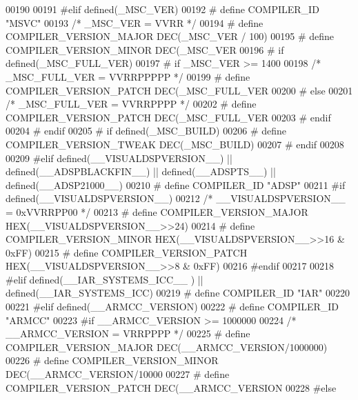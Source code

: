 \begin{DoxyCode}
{{{{{{{{{{{{{{{{{{{{{{{00190 
00191 \textcolor{preprocessor}{#elif defined(\_MSC\_VER)}
00192 \textcolor{preprocessor}{# define COMPILER\_ID "MSVC"}
00193   \textcolor{comment}{/* \_MSC\_VER = VVRR */}
00194 \textcolor{preprocessor}{# define COMPILER\_VERSION\_MAJOR DEC(\_MSC\_VER / 100)}
00195 \textcolor{preprocessor}{# define COMPILER\_VERSION\_MINOR DEC(\_MSC\_VER %
00196 \textcolor{preprocessor}{# if defined(\_MSC\_FULL\_VER)}
00197 \textcolor{preprocessor}{#  if \_MSC\_VER >= 1400}
00198     \textcolor{comment}{/* \_MSC\_FULL\_VER = VVRRPPPPP */}
00199 \textcolor{preprocessor}{#   define COMPILER\_VERSION\_PATCH DEC(\_MSC\_FULL\_VER %
00200 \textcolor{preprocessor}{#  else}
00201     \textcolor{comment}{/* \_MSC\_FULL\_VER = VVRRPPPP */}
00202 \textcolor{preprocessor}{#   define COMPILER\_VERSION\_PATCH DEC(\_MSC\_FULL\_VER %
00203 \textcolor{preprocessor}{#  endif}
00204 \textcolor{preprocessor}{# endif}
00205 \textcolor{preprocessor}{# if defined(\_MSC\_BUILD)}
00206 \textcolor{preprocessor}{#  define COMPILER\_VERSION\_TWEAK DEC(\_MSC\_BUILD)}
00207 \textcolor{preprocessor}{# endif}
00208 
00209 \textcolor{preprocessor}{#elif defined(\_\_VISUALDSPVERSION\_\_) || defined(\_\_ADSPBLACKFIN\_\_) || defined(\_\_ADSPTS\_\_) ||
       defined(\_\_ADSP21000\_\_)}
00210 \textcolor{preprocessor}{# define COMPILER\_ID "ADSP"}
00211 \textcolor{preprocessor}{#if defined(\_\_VISUALDSPVERSION\_\_)}
00212   \textcolor{comment}{/* \_\_VISUALDSPVERSION\_\_ = 0xVVRRPP00 */}
00213 \textcolor{preprocessor}{# define COMPILER\_VERSION\_MAJOR HEX(\_\_VISUALDSPVERSION\_\_>>24)}
00214 \textcolor{preprocessor}{# define COMPILER\_VERSION\_MINOR HEX(\_\_VISUALDSPVERSION\_\_>>16 & 0xFF)}
00215 \textcolor{preprocessor}{# define COMPILER\_VERSION\_PATCH HEX(\_\_VISUALDSPVERSION\_\_>>8  & 0xFF)}
00216 \textcolor{preprocessor}{#endif}
00217 
00218 \textcolor{preprocessor}{#elif defined(\_\_IAR\_SYSTEMS\_ICC\_\_ ) || defined(\_\_IAR\_SYSTEMS\_ICC)}
00219 \textcolor{preprocessor}{# define COMPILER\_ID "IAR"}
00220 
00221 \textcolor{preprocessor}{#elif defined(\_\_ARMCC\_VERSION)}
00222 \textcolor{preprocessor}{# define COMPILER\_ID "ARMCC"}
00223 \textcolor{preprocessor}{#if \_\_ARMCC\_VERSION >= 1000000}
00224   \textcolor{comment}{/* \_\_ARMCC\_VERSION = VRRPPPP */}
00225 \textcolor{preprocessor}{  # define COMPILER\_VERSION\_MAJOR DEC(\_\_ARMCC\_VERSION/1000000)}
00226 \textcolor{preprocessor}{  # define COMPILER\_VERSION\_MINOR DEC(\_\_ARMCC\_VERSION/10000 %
00227 \textcolor{preprocessor}{  # define COMPILER\_VERSION\_PATCH DEC(\_\_ARMCC\_VERSION     %
00228 \textcolor{preprocessor}{#else}
}}}}}}}}}}}}}}}}}}}}}}}}}}}}
\end{DoxyCode}
